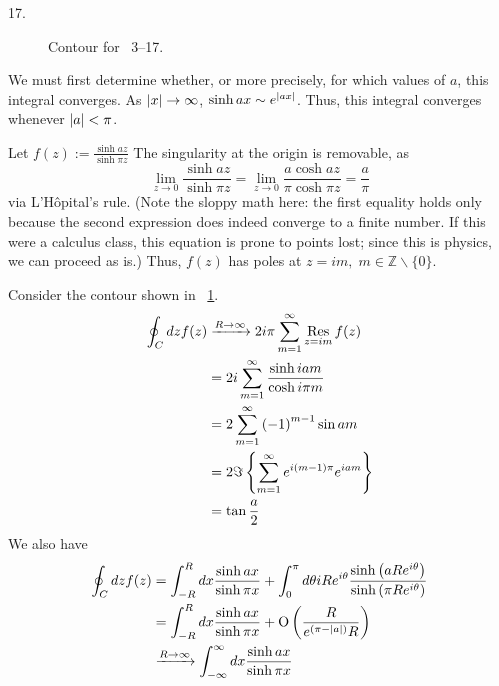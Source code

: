 17.
\begin{figure}[ht]
	\centering
	\caption{Contour for ~3--17.}%
	\label{fig:problem3-17}
\end{figure}

We must first determine whether, or more precisely, for which values of $a$, this integral converges.
As $\left| x \right| \rightarrow \infty$, $\sinh ax \sim e^{\left| ax \right|}$.
Thus, this integral converges whenever $\left| a \right| < \pi$.

Let $f(z) := \frac{\sinh az}{\sinh \pi z}$
The singularity at the origin is removable, as
\[
    \lim_{z \rightarrow 0} \frac{\sinh az}{\sinh \pi z}
    = \lim_{z \rightarrow 0} \frac{a \cosh az}{\pi \cosh \pi z}
    = \frac{a}{\pi}
\]
via L'H\^opital's rule.
(Note the sloppy math here:
the first equality holds only because the second expression does indeed converge to a finite number.
If this were a calculus class, this equation is prone to points lost;
since this is physics, we can proceed as is.)
Thus, $f(z)$ has poles at $z = im,\; m \in \mathbb{Z} \backslash \{0\}$.

Consider the contour shown in ~\ref{fig:problem3-17}.
\begin{align*}
    \oint_C dz f(z)
    &\xrightarrow{R \rightarrow \infty} 2i\pi \sum_{m=1}^\infty \mathop{\mathrm{Res}}_{z = im} f(z) \\
    &= 2i \sum_{m=1}^\infty \frac{\sinh iam}{\cosh i\pi m} \\
    &= 2\sum_{m=1}^\infty {(-1)}^{m-1} \sin am \\
    &= 2 \Im\left\{ \sum_{m=1}^\infty e^{i(m-1)\pi} e^{iam} \right\} \\
    &= \tan \frac{a}{2}
\end{align*}
We also have
\begin{align*}
    \oint_C dz f(z)
    &= \int_{-R}^R dx \frac{\sinh ax}{\sinh \pi x}
     + \int_0^\pi d\theta iRe^{i\theta} \frac{\sinh\left( aRe^{i\theta} \right)}{\sinh\left( \pi Re^{i\theta} \right)} \\ 
    &= \int_{-R}^R dx \frac{\sinh ax}{\sinh \pi x}
     + \operatorname{O}\left( \frac{R}{e^{\left( \pi - \left| a \right| \right)}R} \right) \\
    &\xrightarrow{R \rightarrow \infty} \int_{-\infty}^\infty dx \frac{\sinh ax}{\sinh \pi x}
\end{align*}

